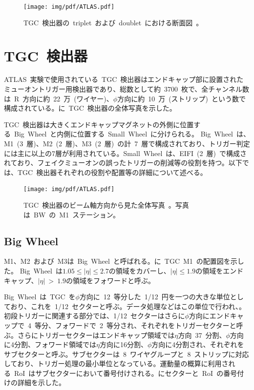 \begin{figure}[H]
        \centering   
        \texttt{[image: img/pdf/ATLAS.pdf]}
        \caption[TGC~検出器の~triplet~および~doublet~における断面図]{TGC~検出器の~triplet~および~doublet~における断面図~\cite{TR:01}。}\label{fig:TGCpri}
\end{figure}

\section{TGC~検出器}
ATLAS~実験で使用されている~TGC~検出器はエンドキャップ部に設置されたミューオントリガー用検出器であり、総数として約~3700~枚で、全チャンネル数は~R~方向に約~22~万~(ワイヤー)、$\phi$方向に約~10~万~(ストリップ)~という数で構成されている。に~TGC~検出器の全体写真を示した。

TGC~検出器は大きくエンドキャップマグネットの外側に位置する~Big~Wheel~と内側に位置する~Small~Wheel~に分けられる。
Big~Wheel~は、M1~(3~層)、M2~(2~層)、M3~(2~層)~の計~7~層で構成されており、トリガー判定には主に以上の7層が利用されている。Small~Wheel~は、EIFI~(2~層)~で構成されており、フェイクミューオンの誤ったトリガーの削減等の役割を持つ。以下では、TGC~検出器それぞれの役割や配置等の詳細について述べる。

\begin{figure}[H]
    \centering   
    \texttt{[image: img/pdf/ATLAS.pdf]}
    \caption[TGC 検出器のビーム軸方向から見た全体写真]{TGC~検出器のビーム軸方向から見た全体写真~\cite{TR:01}。写真は~BW~の~M1~ステーション。}\label{fig:tgc00}
\end{figure}

\subsection{Big Wheel}
M1、M2~および~M3は~Big~Wheel~と呼ばれる。に~TGC~M1~の配置図を示した。
Big~Wheel~は$1.05{\leq}|\eta|{\leq}2.7$の領域をカバーし、$|\eta|{\leq}1.9$の領域をエンドキャップ、$|\eta|~>~1.9$の領域をフォワードと呼ぶ。

Big~Wheel~は~TGC~を$\phi$方向に~12~等分した~1/12~円を一つの大きな単位としており、これを~1/12~セクターと呼ぶ。データ処理などはこの単位で行われ、。初段トリガーに関連する部分では、1/12~セクターはさらに$\phi$方向にエンドキャップで~4~等分、フォワードで~2~等分され、それぞれをトリガーセクターと呼ぶ。さらにトリガーセクターはエンドキャップ領域では$\eta$方向~37~分割、$\phi$方向に4分割、フォワード領域では$\eta$方向に16分割、$\phi$方向に4分割され、それぞれをサブセクターと呼ぶ。サブセクターは~8~ワイヤグループと~8~ストリップに対応しており、トリガー処理の最小単位となっている。運動量の概算に利用される~RoI~はサブセクターにおいて番号付けされる。にセクターと~RoI~の番号付けの詳細を示した。

